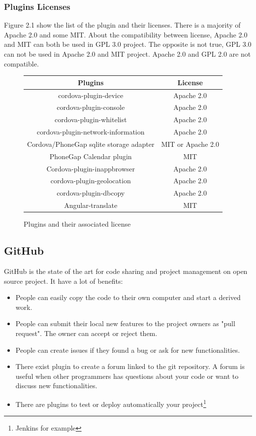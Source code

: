 \documentclass[11pt, a4paper]{report}
\begin{document}
\subsubsection{Plugins Licenses}
Figure 2.1 show the list of the plugin and their licenses. There is a majority of Apache 2.0 and some MIT. About the compatibility between license, Apache 2.0 and MIT can both be used in GPL 3.0 project. The opposite is not true, GPL 3.0 can not be used in Apache 2.0 and MIT project. Apache 2.0 and GPL 2.0 are not compatible. 

\begin{figure}
\begin{center}
\begin{tabular}{c|c}
Plugins & License\\
\hline
cordova-plugin-device & Apache 2.0\\
cordova-plugin-console & Apache 2.0\\
cordova-plugin-whitelist & Apache 2.0\\
cordova-plugin-network-information & Apache 2.0\\
Cordova/PhoneGap sqlite storage adapter & MIT or Apache 2.0\\
PhoneGap Calendar plugin & MIT\\
Cordova-plugin-inappbrowser & Apache 2.0\\
cordova-plugin-geolocation & Apache 2.0\\
cordova-plugin-dbcopy & Apache 2.0\\
Angular-translate & MIT \\
\end{tabular}
\end{center}
\caption{Plugins and their associated license}
\end{figure}
\subsection{GitHub}
GitHub is the state of the art for code sharing and project management on open source project. It have a lot of benefits:
\begin{itemize}
\item People can easily copy the code to their own computer and start a derived work. 
\item People can submit their local new features to the project owners as "pull request". The owner can accept or reject them.
\item People can create issues if they found a bug or ask for new functionalities. 
\item There exist plugin to create a forum linked to the git repository. A forum is useful when other programmers has questions about your code or want to discuss new functionalities.
\item There are plugins to test or deploy automatically your project\footnote{Jenkins for example}
\end{itemize}
\end{document}
